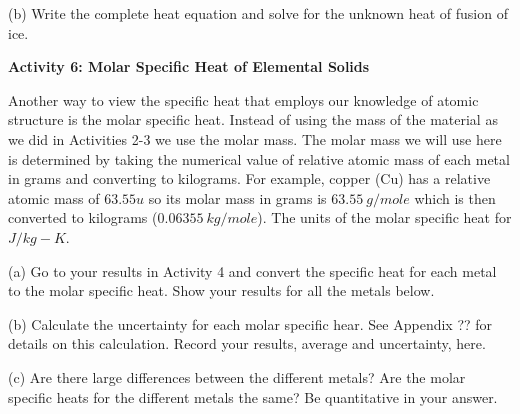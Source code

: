 \answerspace{20mm}

(b) Write the complete heat equation and solve for the unknown heat
of fusion of ice.
\answerspace{25mm}

\textbf{Activity 6: Molar Specific Heat of Elemental Solids}

Another way to view the specific heat that employs our knowledge of atomic structure
is the molar specific heat. 
Instead of using the mass of the material as we did in Activities 2-3 we use the molar mass.
The molar mass we will use here is determined by taking the numerical value of relative atomic mass 
of each metal in grams and converting to kilograms. 
For example, copper (Cu) has a relative atomic mass of $63.55 u$ so its molar mass in grams
is $63.55~g/mole$ which is then converted to kilograms ($0.06355~kg/mole$).
The units of the molar specific heat for $J/kg-K$.

(a) Go to your results in Activity 4 and convert the specific heat for each metal 
to the molar specific heat. Show your results for all the metals below.

\answerspace{3cm}

(b) Calculate the uncertainty for each molar specific hear. See Appendix ?? for
details on this calculation. Record your results, average and uncertainty, here.

\answerspace{3cm}

(c) Are there large differences between the different metals?
Are the molar specific heats for the different metals the same?
Be quantitative in your answer.

\answerspace{3cm}




